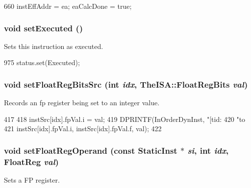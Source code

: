 \begin{DoxyCode}
660 { instEffAddr = ea; eaCalcDone = true; }
\end{DoxyCode}
\hypertarget{classInOrderDynInst_a22145fd061c0a41a9b7d3c8b499269a9}{
\subsubsection[{setExecuted}]{\setlength{\rightskip}{0pt plus 5cm}void setExecuted ()}}
\label{classInOrderDynInst_a22145fd061c0a41a9b7d3c8b499269a9}
Sets this instruction as executed. 


\begin{DoxyCode}
975 { status.set(Executed); }
\end{DoxyCode}
\hypertarget{classInOrderDynInst_ab145f512e94dde24bc1d4a56252285ee}{
\subsubsection[{setFloatRegBitsSrc}]{\setlength{\rightskip}{0pt plus 5cm}void setFloatRegBitsSrc (int {\em idx}, \/  TheISA::FloatRegBits {\em val})}}
\label{classInOrderDynInst_ab145f512e94dde24bc1d4a56252285ee}
Records an fp register being set to an integer value. 


\begin{DoxyCode}
417 {
418     instSrc[idx].fpVal.i = val;
419     DPRINTF(InOrderDynInst, "[tid:%
420             "to %
421             instSrc[idx].fpVal.i, instSrc[idx].fpVal.f, val);
422 }
\end{DoxyCode}
\hypertarget{classInOrderDynInst_addc8b4b6511725bf8ff48bd09ef22892}{
\subsubsection[{setFloatRegOperand}]{\setlength{\rightskip}{0pt plus 5cm}void setFloatRegOperand (const {\bf StaticInst} $\ast$ {\em si}, \/  int {\em idx}, \/  {\bf FloatReg} {\em val})}}
\label{classInOrderDynInst_addc8b4b6511725bf8ff48bd09ef22892}
Sets a FP register. 


